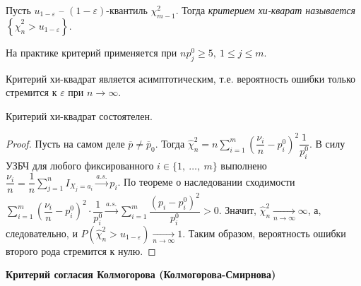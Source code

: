 \begin{definition}
    Пусть $\displaystyle u_{1-\varepsilon }$ -- $\displaystyle ( 1-\varepsilon )$-квантиль $\displaystyle \chi _{m-1}^{2}$. Тогда \textit{критерием хи-кварат называется} $\displaystyle \left\{\hat{\chi }_{n}^{2}  >u_{1-\varepsilon }\right\}$.
\end{definition}
\begin{note}
    На практике критерий применяется при $\displaystyle np_{j}^{0} \geqslant 5,\ 1\leqslant j\leqslant m$.
\end{note}
\begin{note}
    Критерий хи-квадрат является асимптотическим, т.е. вероятность ошибки только стремится к $\displaystyle \varepsilon $ при $\displaystyle n\rightarrow \infty $.
\end{note}
\begin{proposition}
    Критерий хи-квадрат состоятелен.
\end{proposition}
\begin{proof}
    Пусть на самом деле $\displaystyle \overline{p} \neq \overline{p}_{0}$. Тогда $\displaystyle \hat{\chi }_{n}^{2} =n\sum _{i=1}^{m}\left(\dfrac{\nu _{i}}{n} -p_{i}^{0}\right)^{2}\dfrac{1}{p_{i}^{0}}$. В силу УЗБЧ для любого фиксированного $\displaystyle i\in \{1,\ \dotsc ,\ m\}$ выполнено $\displaystyle \dfrac{\nu _{i}}{n} =\dfrac{1}{n}\sum _{j=1}^{n} I_{X_{j} =a_{i}}\xrightarrow{a.s.} p_{i}$. По теореме о наследовании сходимости $\displaystyle \sum _{i=1}^{m}\left(\dfrac{\nu _{i}}{n} -p_{i}^{0}\right)^{2} \cdotp \dfrac{1}{p_{i}^{0}}\xrightarrow{a.s.}\sum _{i=1}^{m}\dfrac{\left( p_{i} -p_{i}^{0}\right)^{2}}{p_{i}^{0}}  >0$. Значит, $\displaystyle \hat{\chi }_{n}^{2}\xrightarrow[n\rightarrow \infty ]{} \infty $, а, следовательно, и $\displaystyle P\left(\hat{\chi }_{n}^{2}  >u_{1-\varepsilon }\right)\xrightarrow[n\rightarrow \infty ]{} 1$. Таким образом, вероятность ошибки второго рода стремится к нулю.
\end{proof}


\textbf{Критерий согласия Колмогорова (Колмогорова-Смирнова)}


